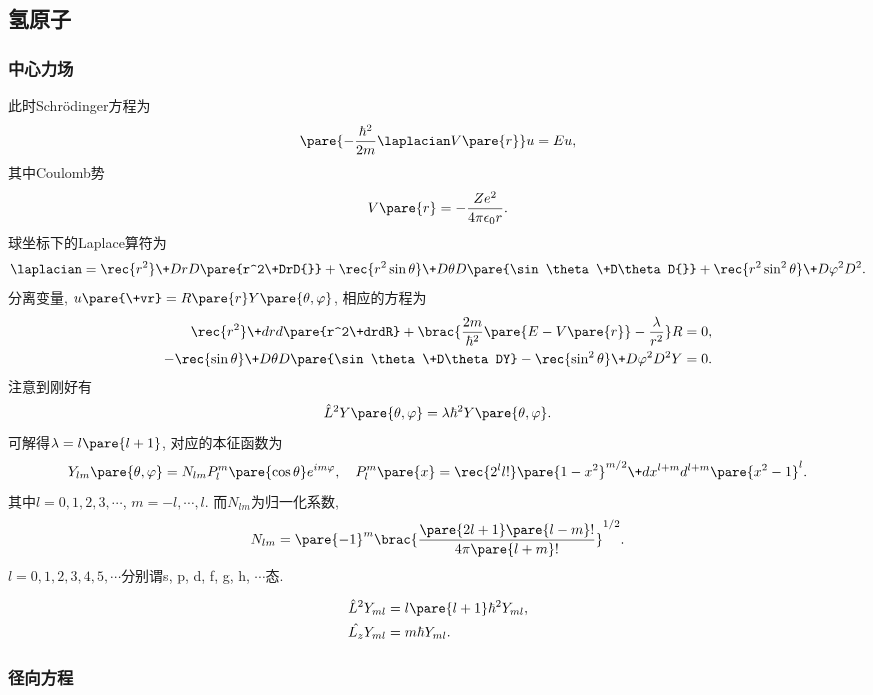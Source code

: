 \documentclass[hidelinks]{ctexart}
\begin{document}


\subsection{氢原子} %
\label{sub:氢原子}

\subsubsection{中心力场} %
\label{ssub:中心力场}

此时Schr\"odinger方程为
\[ \pare{-\frac{\hbar^2}{2m}\laplacian V\pare{r}}u = Eu, \]
其中Coulomb势
\[ V\pare{r} = -\frac{Ze^2}{4\pi\epsilon_0 r}. \]
球坐标下的Laplace算符为
\[ \laplacian = \rec{r^2}\+DrD{}\pare{r^2\+DrD{}} + \rec{r^2\sin\theta}\+D\theta D{}\pare{\sin\theta \+D\theta D{}} + \rec{r^2 \sin^2\theta} \+D{\varphi^2}D{^2}. \]
分离变量, $u\pare{\+vr} = R\pare{r}Y\pare{\theta,\varphi}$, 相应的方程为
\begin{align*}
    \rec{r^2}\+drd{}\pare{r^2\+drdR} + \brac{\frac{2m}{\hbar^2}\pare{E-V\pare{r}} - \frac{\lambda}{r^2}}R &= 0, \\
    -\rec{\sin\theta}\+D\theta D{}\pare{\sin\theta \+D\theta DY} - \rec{\sin^2\theta}\+D{\varphi^2}D{^2Y} &= 0.
\end{align*}
注意到刚好有
\[ \hat{L}^2 Y\pare{\theta,\varphi} = \lambda \hbar^2 Y\pare{\theta,\varphi}. \]
可解得$\lambda = l\pare{l+1}$, 对应的本征函数为
\[ Y_{lm}\pare{\theta,\varphi} = N_{lm}P_l^m \pare{\cos\theta}e^{im\varphi},\quad P_l^m\pare{x} = \rec{2^l l!}\pare{1-x^2}^{m/2} \+d{x^{l+m}}d{^{l+m}}\pare{x^2 - 1}^l. \]
其中$l = 0,1,2,3,\cdots$, $m = -l,\cdots,l$. 而$N_{lm}$为归一化系数,
\[ N_{lm} = \pare{-1}^m \brac{\frac{\pare{2l+1}\pare{l-m}!}{4\pi\pare{l+m}!}}^{1/2}. \]
$l=0,1,2,3,4,5,\cdots$分别谓s, p, d, f, g, h, $\cdots$态.
\begin{resume}
    \vspace{-\baselineskip}
    \begin{align*}
        \hat{L}^2 Y_{ml} &= l\pare{l+1}\hbar^2 Y_{ml}, \\
        \hat{L_z} Y_{ml} &= m\hbar Y_{ml}.
    \end{align*}
\end{resume}


\subsubsection{径向方程} %
\label{ssub:径向方程}
\end{document}
